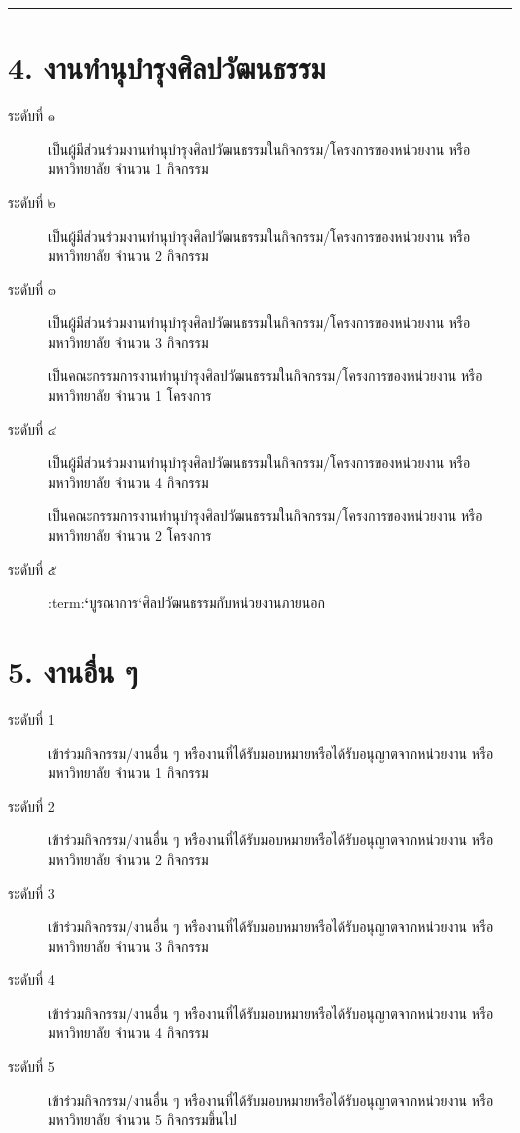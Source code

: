 \documentclass[a4paper,12pt,english]{sphinxmanual}
\begin{document}
\bigskip\hrule\bigskip



\section{4. งานทำนุบำรุงศิลปวัฒนธรรม}
\label{\detokenize{submission_part1:id19}}\begin{description}
\item[{ระดับที่ ๑}] \leavevmode
เป็นผู้มีส่วนร่วมงานทำนุบำรุงศิลปวัฒนธรรมในกิจกรรม/โครงการของหน่วยงาน หรือมหาวิทยาลัย จำนวน 1 กิจกรรม

\item[{ระดับที่ ๒}] \leavevmode
เป็นผู้มีส่วนร่วมงานทำนุบำรุงศิลปวัฒนธรรมในกิจกรรม/โครงการของหน่วยงาน หรือมหาวิทยาลัย จำนวน 2 กิจกรรม

\item[{ระดับที่ ๓}] \leavevmode
เป็นผู้มีส่วนร่วมงานทำนุบำรุงศิลปวัฒนธรรมในกิจกรรม/โครงการของหน่วยงาน หรือมหาวิทยาลัย จำนวน 3 กิจกรรม

 เป็นคณะกรรมการงานทำนุบำรุงศิลปวัฒนธรรมในกิจกรรม/โครงการของหน่วยงาน หรือมหาวิทยาลัย จำนวน 1 โครงการ

\item[{ระดับที่ ๔}] \leavevmode
เป็นผู้มีส่วนร่วมงานทำนุบำรุงศิลปวัฒนธรรมในกิจกรรม/โครงการของหน่วยงาน หรือมหาวิทยาลัย จำนวน 4 กิจกรรม

 เป็นคณะกรรมการงานทำนุบำรุงศิลปวัฒนธรรมในกิจกรรม/โครงการของหน่วยงาน หรือมหาวิทยาลัย จำนวน 2 โครงการ

\item[{ระดับที่ ๕}] \leavevmode
:term:{\color{red}\bfseries{}`}บูรณาการ`ศิลปวัฒนธรรมกับหน่วยงานภายนอก

\end{description}


\section{5. งานอื่น ๆ}
\label{\detokenize{submission_part1:id22}}\begin{description}
\item[{ระดับที่ 1}] \leavevmode
เข้าร่วมกิจกรรม/งานอื่น ๆ หรืองานที่ได้รับมอบหมายหรือได้รับอนุญาตจากหน่วยงาน หรือมหาวิทยาลัย จำนวน 1 กิจกรรม

\item[{ระดับที่ 2}] \leavevmode
เข้าร่วมกิจกรรม/งานอื่น ๆ หรืองานที่ได้รับมอบหมายหรือได้รับอนุญาตจากหน่วยงาน หรือมหาวิทยาลัย จำนวน 2 กิจกรรม

\item[{ระดับที่ 3}] \leavevmode
เข้าร่วมกิจกรรม/งานอื่น ๆ หรืองานที่ได้รับมอบหมายหรือได้รับอนุญาตจากหน่วยงาน หรือมหาวิทยาลัย จำนวน 3 กิจกรรม

\item[{ระดับที่ 4}] \leavevmode
เข้าร่วมกิจกรรม/งานอื่น ๆ หรืองานที่ได้รับมอบหมายหรือได้รับอนุญาตจากหน่วยงาน หรือมหาวิทยาลัย จำนวน 4 กิจกรรม

\item[{ระดับที่ 5}] \leavevmode
เข้าร่วมกิจกรรม/งานอื่น ๆ หรืองานที่ได้รับมอบหมายหรือได้รับอนุญาตจากหน่วยงาน หรือมหาวิทยาลัย จำนวน 5 กิจกรรมขึ้นไป

\end{description}
\end{document}
